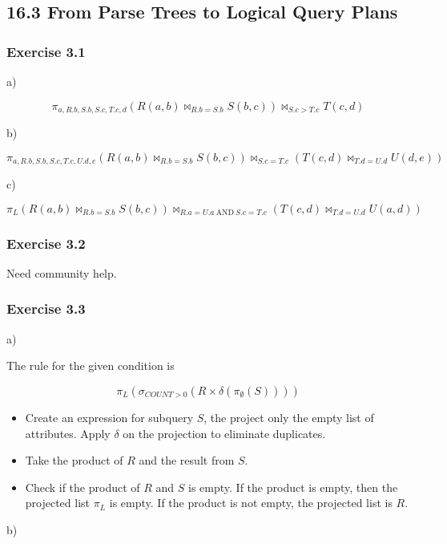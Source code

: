 \documentclass[../../main.tex]{subfiles}
\begin{document}
\subsection{16.3 From Parse Trees to Logical Query Plans}

\subsubsection*{Exercise 3.1}

a)

$$
\pi_{a, R.b, S.b, S.c, T.c, d}(R(a, b) \bowtie_{R.b = S.b} S(b, c)) \bowtie_{S.c > T.c} T(c, d)
$$

b)

$$
\pi_{a, R.b, S.b, S.c, T.c, U.d, e}(R(a, b) \bowtie_{R.b = S.b} S(b,c))
\bowtie_{S.c = T.c}(T(c, d) \bowtie_{T.d = U.d} U(d,e))
$$

c)

$$
\pi_{L}(R(a, b) \bowtie_{R.b = S.b} S(b,c)) \bowtie_{R.a = U.a \ \text{AND} \ S.c = T.c}
(T(c, d) \bowtie_{T.d = U.d} U(a,d))
$$

\subsubsection*{Exercise 3.2}

Need community help.

\subsubsection*{Exercise 3.3}

a)

The rule for the given condition is

$$
\pi_{L}(\sigma_{COUNT > 0}(R \times \delta(\pi_{\emptyset}(S))))
$$

\begin{itemize}
  \item Create an expression for subquery $S$, the project only the empty
        list of attributes. Apply $\delta$ on the projection to eliminate
        duplicates.
  \item Take the product of $R$ and the result from $S$.
  \item Check if the product of $R$ and $S$ is empty. If the product is empty,
        then the projected list $\pi_{L}$ is empty. If the product is not empty,
        the projected list is $R$.
\end{itemize}

b)
\end{document}
